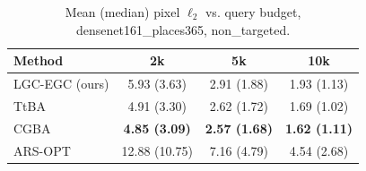 \begin{table}[t]
\centering\footnotesize
\caption{Mean (median) pixel $\ell_2$ vs. query budget, densenet161\_places365, non\_targeted.}
\begin{tabular}{lccc}
\toprule
Method & 2k & 5k & 10k \\
\midrule
LGC-EGC (ours) & 5.93 (3.63) & 2.91 (1.88) & 1.93 (1.13) \\
TtBA & 4.91 (3.30) & 2.62 (1.72) & 1.69 (1.02) \\
CGBA & \textbf{4.85 (3.09)} & \textbf{2.57 (1.68)} & \textbf{1.62 (1.11)} \\
ARS-OPT & 12.88 (10.75) & 7.16 (4.79) & 4.54 (2.68) \\
\bottomrule
\end{tabular}
\end{table}
